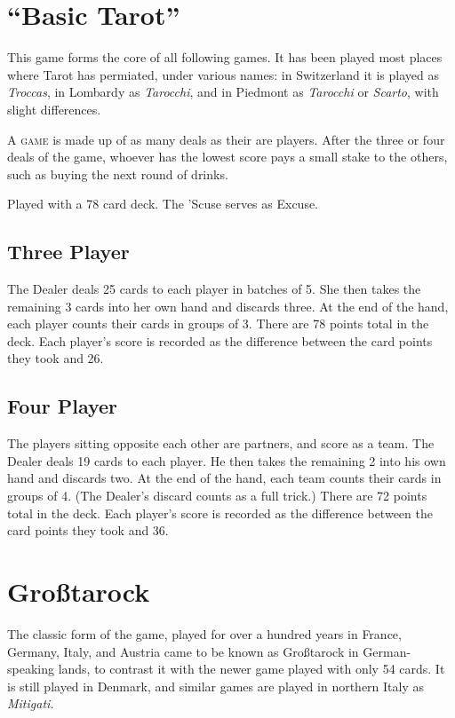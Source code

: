 \documentclass[ebook,12pt,twoside,openright,extrafontsizes,final]{memoir}
\begin{document}
\chapter{“Basic Tarot”}
This game forms the core of all following games. It has been played most 
places where Tarot has permiated, under various names: in Switzerland
it is played as \emph{Troccas}, in Lombardy as \emph{Tarocchi}, and in Piedmont
as \emph{Tarocchi} or \emph{Scarto}, with slight differences.

\medskip
\lettrine{A}{ game} is made up of as many deals as their are players.  After the 
three or four deals of the game, whoever has the lowest score pays a small stake 
to the others, such as buying the next round of drinks.

Played with a 78 card deck. The ’Scuse serves as Excuse.

\section{Three Player}
The Dealer deals 25 cards to each player in batches of 5.  She then takes the
remaining 3 cards into her own hand and discards three.
At the end of the hand, each player counts their cards in groups of 3.  There
are 78 points total in the deck.  Each player's score is recorded as the 
difference between the card points they took and 26.

\section{Four Player}
The players sitting opposite each other are partners, and score as a team.
The Dealer deals 19 cards to each player.  He then takes the remaining 2 into 
his own hand and discards two.
At the end of the hand, each team counts their cards in groups of 4. (The 
Dealer’s discard counts as a full trick.)  There are 72 points total in the 
deck.  Each player's score is recorded as the difference between the card 
points they took and 36.


\chapter{Großtarock}
The classic form of the game, played for over a hundred years in France, Germany, 
Italy, and Austria came to be known as Großtarock in German-speaking lands, to contrast
it with the newer game played with only 54 cards. It is still played in Denmark, and 
similar games are played in northern Italy as \emph{Mitigati.}
\end{document}

